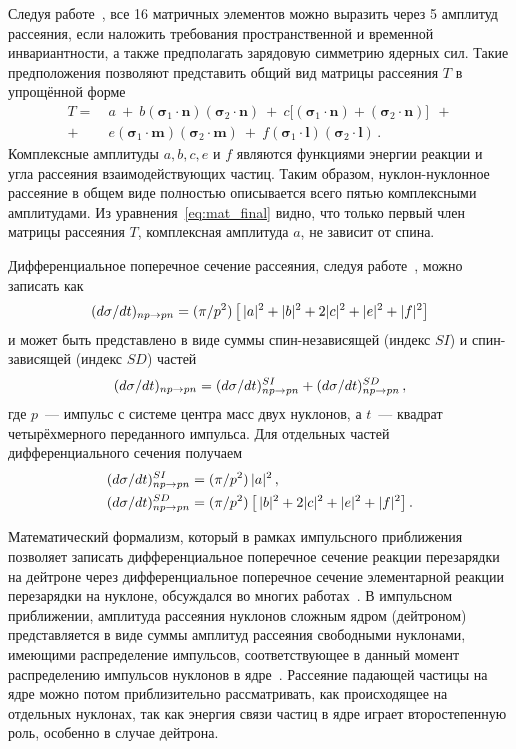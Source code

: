 Следуя работе~\cite{gold66}, все 16 матричных элементов можно выразить через 5
амплитуд рассеяния, если наложить требования пространственной и временной
инвариантности, а также предполагать зарядовую симметрию ядерных сил. Такие
предположения позволяют представить общий вид матрицы рассеяния $T$ в упрощённой
форме
\begin{equation}
  \label{eq:mat_final}
  \begin{split}
    T =\ &a\ +\ b
    (\boldsymbol{\sigma}_1\cdot\mathbf{n})
    (\boldsymbol{\sigma}_2\cdot\mathbf{n})\ +\ c\bigl[
      (\boldsymbol{\sigma}_1\cdot\mathbf{n}) +
      (\boldsymbol{\sigma}_2\cdot\mathbf{n})\bigr]\ \ +\\
    +\ &e
    (\boldsymbol{\sigma}_1\cdot\mathbf{m})
    (\boldsymbol{\sigma}_2\cdot\mathbf{m})\ +\ f
    (\boldsymbol{\sigma}_1\cdot\mathbf{l})
    (\boldsymbol{\sigma}_2\cdot\mathbf{l})\,.
  \end{split}
\end{equation}
Комплексные амплитуды $a, b, c, e$ и $f$ являются функциями энергии реакции и
угла рассеяния взаимодействующих частиц. Таким образом, нуклон-нуклонное
рассеяние в общем виде полностью описывается всего пятью комплексными
амплитудами. Из уравнения~\eqref{eq:mat_final} видно, что только первый член
матрицы рассеяния $T$, комплексная амплитуда $a$, не зависит от спина.

Дифференциальное поперечное сечение \np рассеяния, следуя работе~\cite{bys78_2},
можно записать как
\begin{equation}
  (d\sigma/dt)_{np \rightarrow pn} = (\pi/p^2)\,
  \bigl[\,|a|^2 + |b|^2 + 2|c|^2 + |e|^2 + |f|^2 \bigr]
\end{equation}
и может быть представлено в виде суммы спин-независящей (индекс $SI$) и
спин-зависящей (индекс $SD$) частей
\begin{equation}
  (d\sigma/dt)_{np \rightarrow pn} = (d\sigma/dt)^{SI}_{np \rightarrow pn} + (d\sigma/dt)^{SD}_{np \rightarrow pn}\,,
\end{equation}
где $p$~--- импульс с системе центра масс двух нуклонов, а $t$~--- квадрат
четырёхмерного переданного импульса. Для отдельных частей дифференциального
сечения получаем
\begin{align}
  (d\sigma/dt)^{SI}_{np \rightarrow pn} &= (\pi/p^2)\,|a|^2\,,\\
  \label{eq:np_SD}
  (d\sigma/dt)^{SD}_{np \rightarrow pn} &= (\pi/p^2)\,
  \bigl[\,|b|^2 + 2|c|^2 + |e|^2 + |f|^2\bigr]\,.
\end{align}

Математический формализм, который в рамках импульсного приближения позволяет
записать дифференциальное поперечное сечение реакции перезарядки на дейтроне
через дифференциальное поперечное сечение элементарной реакции перезарядки
на нуклоне, обсуждался во многих работах~\cite{dean72,dean72_2,bugg87}.
В импульсном приближении, амплитуда рассеяния нуклонов сложным ядром (дейтроном)
представляется в виде суммы амплитуд рассеяния свободными нуклонами, имеющими
распределение импульсов, соответствующее в данный момент распределению импульсов
нуклонов в ядре~\cite{chew50,chew52}. Рассеяние падающей частицы на ядре можно
потом приблизительно рассматривать, как происходящее на отдельных нуклонах, так
как энергия связи частиц в ядре играет второстепенную роль, особенно в случае
дейтрона.

